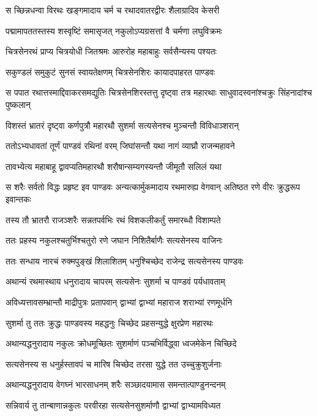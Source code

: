 \twolineshloka
{स च्छिन्नधन्वा विरथः खङ्गमादाय चर्म च}
{रथादवातरद्वीरः शैलाग्रादिव केसरी}


\twolineshloka
{पद्मामापततस्तस्य शस्वृष्टिं समासृजत्}
{नकुलोऽप्यग्रसत्तां वै चर्मणा लघुविक्रमः}


\twolineshloka
{चित्रसेनरथं प्राप्य चित्रयोधी जितश्रमः}
{आरुरोह महाबाहुः सर्वसैन्यस्य पश्यतः}


\twolineshloka
{सकुण्डलं समुकुटं सुनसं स्वायतेक्षणम्}
{चित्रसेनशिरः कायादपाहरत पाण्डवः}


स पपात रथात्तस्माद्दिवाकरसमद्युतिः
\twolineshloka
{चित्रसेनशिरस्तत्तु दृष्ट्वा तत्र महारथाः}
{साधुवादस्वनांश्चक्रुः सिंहनादांश्च पुष्कलान्}


\twolineshloka
{विशस्तं भ्रातरं दृष्ट्वा कर्णपुत्रौ महारथौ}
{सुशर्मा सत्यसेनश्च मुञ्चन्तौ विविधाञ्शरान्}


\twolineshloka
{ततोऽभ्यधावतां तूर्णं पाण्डवं रथिनां वरम्}
{जिघांसन्तौ यथा नागं व्याघ्रौ राजन्महावने}


\twolineshloka
{तावभ्येत्य महाबाहू द्वावप्यतिमहारथौ}
{शरौषान्सम्यगस्यन्तौ जीमूतौ सलिलं यथा}


\threelineshloka
{स शरैः सर्वतो विद्धः प्रहृष्ट इव पाण्डवः}
{अन्यत्कार्मुकमादाय रथमारुह्य वेगवान्}
{अतिष्ठत रणे वीरः क्रुद्धरूप इवान्तकः}


\twolineshloka
{तस्य तौ भ्रातरौ राजञ्शरैः सन्नतपर्वभिः}
{रथं विशकलीकर्तुं समारब्धौ विशाम्पते}


\twolineshloka
{ततः प्रहस्य नकुलश्चतुर्भिश्चतुरो रणे}
{जघान निशितैर्बाणैः सत्यसेनस्य वाजिनः}


\twolineshloka
{ततः सन्धाय नारचं रुक्मपुङ्खं शिलाशितम्}
{धनुश्चिच्छेद राजेन्द्र सत्यसेनस्य पाण्डवः}


\twolineshloka
{अथान्यं रथमास्थाय धनुरादाय चापरम्}
{सत्यसेनः सुशर्मा च पाण्डवं पर्यधावताम्}


\twolineshloka
{अविध्यत्तावसम्भ्रान्तौ माद्रीपुत्रः प्रतापवान्}
{द्वाभ्यां द्वाभ्यां महाराज शराभ्यां रणमूर्धनि}


\twolineshloka
{सुशर्मा तु ततः क्रुद्धः पाण्डवस्य महद्धनुः}
{चिच्छेद प्रहसन्युद्धे क्षुरप्रेण महारथः}


\twolineshloka
{अथान्यद्धनुरादाय नकुलः क्रोधमूच्छितः}
{सुशर्माणं पञ्चभिर्विद्ध्वा ध्वजमेकेन चिच्छिदे}


\twolineshloka
{सत्यसेनस्य स धनुर्हस्तावपं च मारिष}
{चिच्छेद तरसा युद्धे तत उच्चुक्रुशुर्जनाः}


\twolineshloka
{अथान्यद्धनुरादाय वेगघ्नं भारसाधनम्}
{शरैः सञ्छादयामास समन्तात्पाण्डुनन्दनम्}


\twolineshloka
{सन्निवार्य तु तान्बाणान्नकुलः परवीरहा}
{सत्यसेनसुशर्माणौ द्वाभ्यां द्वाभ्यामविध्यत}


